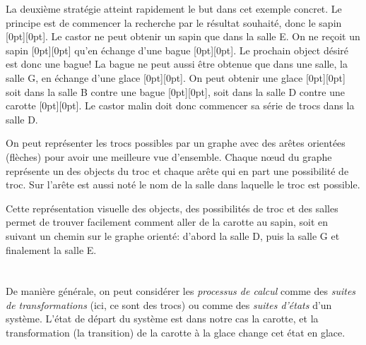 {{La deuxième stratégie atteint rapidement le but dans cet exemple concret. Le principe est de commencer la recherche par le résultat souhaité, donc le sapin \raisebox{-0.5ex}[0pt][0pt]{}. Le castor ne peut obtenir un sapin que dans la salle E. On ne reçoit un sapin \raisebox{-0.5ex}[0pt][0pt]{} qu’en échange d’une bague \raisebox{-0.5ex}[0pt][0pt]{}. Le prochain object désiré est donc une bague! La bague ne peut aussi être obtenue que dans une salle, la salle G, en échange d’une glace \raisebox{-0.5ex}[0pt][0pt]{}. On peut obtenir une glace  \raisebox{-0.5ex}[0pt][0pt]{} soit dans la salle B contre une bague \raisebox{-0.5ex}[0pt][0pt]{}, soit dans la salle D contre une carotte \raisebox{-0.5ex}[0pt][0pt]{}. Le castor malin doit donc commencer sa série de trocs dans la salle D.

On peut représenter les trocs possibles par un graphe avec des arêtes orientées (flèches) pour avoir une meilleure vue d’ensemble. Chaque nœud du graphe représente un des objects du troc et chaque arête qui en part une possibilité de troc. Sur l’arête est aussi noté le nom de la salle dans laquelle le troc est possible.

{\centering%
\par}

Cette représentation visuelle des objects, des possibilités de troc et des salles permet de trouver facilement comment aller de la carotte au sapin, soit en suivant un chemin sur le graphe orienté: d’abord la salle D, puis la salle G et finalement la salle E.



\section*{\BrochureItsInformatics}
De manière générale, on peut considérer les \emph{processus de calcul} comme des \emph{suites de transformations} (ici, ce sont des trocs) ou comme des \emph{suites d’états} d’un système. L’état de départ du système est dans notre cas la carotte, et la transformation (la transition) de la carotte à la glace change cet état en glace.

}}
